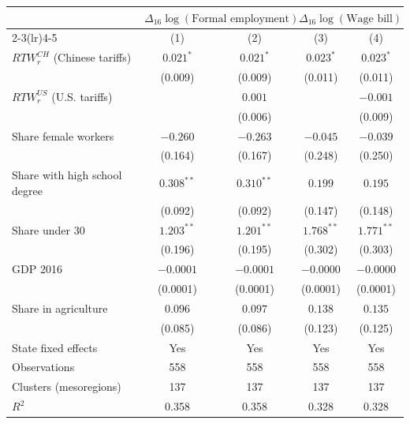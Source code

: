 \begin{tabular}{l*{4}{c}}
\toprule
 & \multicolumn{2}{c}{$\Delta_{16}\log(\text{Formal employment})$} & \multicolumn{2}{c}{$\Delta_{16}\log(\text{Wage bill})$} \\
\cmidrule(lr){2-3}\cmidrule(lr){4-5}
 & (1) & (2) & (3) & (4) \\
\midrule
$RTW_r^{CH}$ (Chinese tariffs) & $0.021^{*}$ & $0.021^{*}$ & $0.023^{*}$ & $0.023^{*}$ \\
 & (0.009) & (0.009) & (0.011) & (0.011) \\[2pt]
$RTW_r^{US}$ (U.S. tariffs) &  & $0.001$ &  & $-0.001$ \\
 &  & (0.006) &  & (0.009) \\[2pt]
Share female workers & $-0.260$ & $-0.263$ & $-0.045$ & $-0.039$ \\
 & (0.164) & (0.167) & (0.248) & (0.250) \\[2pt]
Share with high school degree & $0.308^{**}$ & $0.310^{**}$ & $0.199$ & $0.195$ \\
 & (0.092) & (0.092) & (0.147) & (0.148) \\[2pt]
Share under 30 & $1.203^{**}$ & $1.201^{**}$ & $1.768^{**}$ & $1.771^{**}$ \\
 & (0.196) & (0.195) & (0.302) & (0.303) \\[2pt]
GDP 2016 & $-0.0001$ & $-0.0001$ & $-0.0000$ & $-0.0000$ \\
 & (0.0001) & (0.0001) & (0.0001) & (0.0001) \\[2pt]
Share in agriculture & $0.096$ & $0.097$ & $0.138$ & $0.135$ \\
 & (0.085) & (0.086) & (0.123) & (0.125) \\[2pt]
\midrule
State fixed effects & Yes & Yes & Yes & Yes \\
Observations & 558 & 558 & 558 & 558 \\
Clusters (mesoregions) & 137 & 137 & 137 & 137 \\
$R^2$ & 0.358 & 0.358 & 0.328 & 0.328 \\
\bottomrule
\end{tabular}
